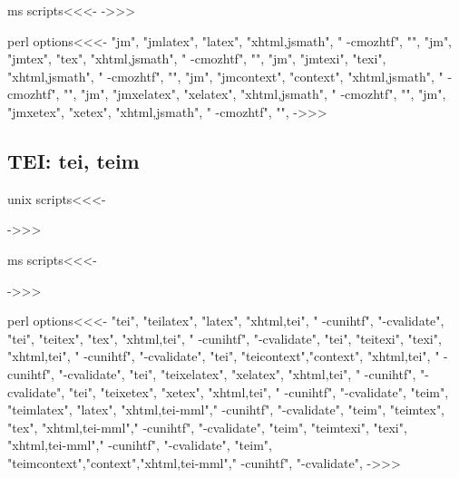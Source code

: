\documentclass{article}
\begin{document}
\<ms scripts\><<<-
->>>


\<perl options\><<<-
 "jm", "jmlatex",   "latex",   "xhtml,jsmath", " -cmozhtf", "",
 "jm", "jmtex",     "tex",     "xhtml,jsmath", " -cmozhtf", "",
 "jm", "jmtexi",    "texi",    "xhtml,jsmath", " -cmozhtf", "",
 "jm", "jmcontext", "context", "xhtml,jsmath", " -cmozhtf", "",
 "jm", "jmxelatex",   "xelatex",   "xhtml,jsmath", " -cmozhtf", "",
 "jm", "jmxetex",     "xetex",     "xhtml,jsmath", " -cmozhtf", "",
->>>








\subsection{TEI: tei, teim}

\<unix scripts\><<<-

->>>

\<ms scripts\><<<-

->>>


\<perl options\><<<-
 "tei",  "teilatex",  "latex",   "xhtml,tei",    " -cunihtf",  "-cvalidate",
 "tei",  "teitex",    "tex",     "xhtml,tei",    " -cunihtf",  "-cvalidate",
 "tei",  "teitexi",   "texi",    "xhtml,tei",    " -cunihtf",  "-cvalidate",
 "tei",  "teicontext","context", "xhtml,tei",    " -cunihtf",  "-cvalidate",
 "tei",  "teixelatex",  "xelatex",   "xhtml,tei",    " -cunihtf",  "-cvalidate",
 "tei",  "teixetex",    "xetex",     "xhtml,tei",    " -cunihtf",  "-cvalidate",
 "teim", "teimlatex", "latex",   "xhtml,tei-mml"," -cunihtf",  "-cvalidate",
 "teim", "teimtex",   "tex",     "xhtml,tei-mml"," -cunihtf",  "-cvalidate",
 "teim", "teimtexi",  "texi",    "xhtml,tei-mml"," -cunihtf",  "-cvalidate",
 "teim", "teimcontext","context","xhtml,tei-mml"," -cunihtf",  "-cvalidate",
->>>
\end{document}
